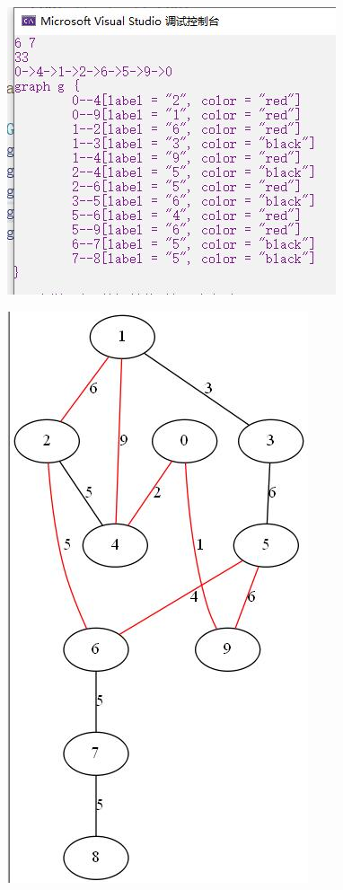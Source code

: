 \documentclass[UTF8]{article}
\begin{document}
	\begin{figure}[H]
		\begin{minipage}[H]{0.48\linewidth}
			\centering
			\includegraphics[scale=0.45]{output31.jpg}
			\label{output31}
		\end{minipage}
		\qquad
		\begin{minipage}[H]{0.48\linewidth}
			\centering
			\includegraphics[scale=0.45]{output311.jpg}
			\label{output311}
		\end{minipage}
	\end{figure}
\end{document}

